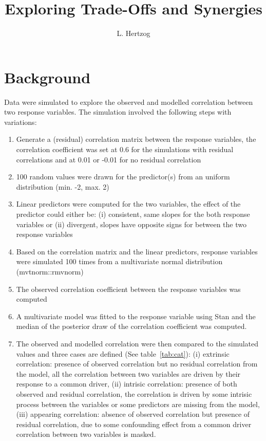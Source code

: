 \documentclass[a4paper,10pt]{article}
\title{Exploring Trade-Offs and Synergies}
\author{L. Hertzog}
\begin{document}
\maketitle

\section{Background}

Data were simulated to explore the observed and modelled correlation between two response variables. The simulation involved the following steps with variations:

\begin{enumerate}
 \item Generate a (residual) correlation matrix between the response variables, the correlation coefficient was set at 0.6 for the simulations with residual correlations and at 0.01 or -0.01 for no residual correlation
 \item 100 random values were drawn for the predictor(s) from an uniform distribution (min. -2, max. 2)
 \item Linear predictors were computed for the two variables, the effect of the predictor could either be: (i) consistent, same slopes for the both response variables or (ii) divergent, slopes have opposite signs for between the two response variables
 \item Based on the correlation matrix and the linear predictors, response variables were simulated 100 times from a multivariate normal distribution (mvtnorm::rmvnorm)
 \item The observed correlation coefficient between the response variables was computed
 \item A multivariate model was fitted to the response variable using Stan and the median of the posterior draw of the correlation coefficient was computed.
 \item The observed and modelled correlation were then compared to the simulated values and three cases are defined (See table~\ref{tab:cat}): (i) extrinsic correlation: presence of observed correlation but no residual correlation from the model, all the correlation between two variables are driven by their response to a common driver, (ii) intrisic correlation: presence of both observed and residual correlation, the correlation is driven by some intrisic process between the variables or some predictors are missing from the model, (iii) appearing correlation: absence of observed correlation but presence of residual correlation, due to some confounding effect from a common driver correlation between two variables is masked.
\end{enumerate}
\end{document}
